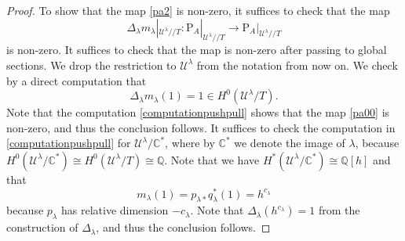 \documentclass [11pt,oneside,a4paper,mathscr]{amsart}
\theoremstyle{definition}
\renewcommand{\leq}{\leqslant}
\newcommand{\X}{\mathscr{X}}
\newcommand{\ssslash}{/\!\!/}
\begin{document}
\begin{proof}
    To show that the map \eqref{pa2} is non-zero, it suffices to check that the map 
    \begin{equation}\label{pa00}
    \Delta_\lambda m_\lambda|_{\mathscr{U}^\lambda \ssslash T}\colon \mathrm{P}_A|_{\mathscr{U}^\lambda \ssslash T}\to \mathrm{P}_A|_{\mathscr{U}^\lambda \ssslash T}
    \end{equation} is non-zero. It suffices to check that the map is non-zero after passing to global sections. We drop the restriction to $\mathscr{U}^\lambda$ from the notation from now on.
    We check by a direct computation that 
    \begin{equation}\label{computationpushpull}
    \Delta_\lambda m_\lambda(1)=1\in H^0(\mathscr{U}^\lambda/T).
    \end{equation}
    Note that the computation \eqref{computationpushpull} shows that the map \eqref{pa00} is non-zero, and thus the conclusion follows. It suffices to check the computation in \eqref{computationpushpull} for $\mathscr{U}^\lambda/\mathbb{C}^*$, where by $\mathbb{C}^*$ we denote the image of $\lambda$, because $H^0(\mathscr{U}^\lambda/\mathbb{C}^*)\cong H^0(\mathscr{U}^{\lambda}/T)\cong \mathbb{Q}$. Note that we have $H^{\ast}(\mathscr{U}^\lambda/\mathbb{C}^*)\cong \mathbb{Q}[h]$ and that \[m_\lambda(1)=p_{\lambda*}q_\lambda^*(1)=h^{c_\lambda}\] because $p_\lambda$ has relative dimension $-c_\lambda$. Note that $\Delta_\lambda(h^{c_\lambda})=1$ from the construction of $\Delta_\lambda$, and thus the conclusion follows. 
    


\end{proof}
\end{document}
